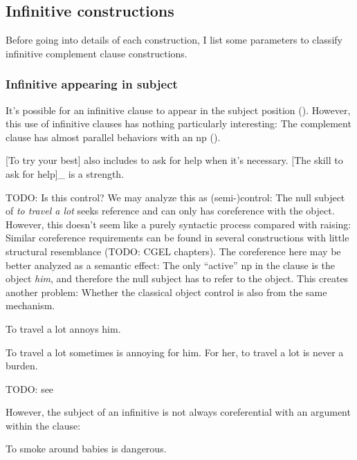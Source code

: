 \documentclass[UTF8, a4paper, oneside, scheme=plain, 12pt]{ctexbook}
\newcommand*{\citepage}[1]{p.~{#1}}
\newcommand{\form}[1]{\emph{#1}}
\begin{document}
\subsection{Infinitive constructions}

Before going into details of each construction,
I list some parameters to classify infinitive complement clause constructions.

\subsubsection{Infinitive appearing in subject}

It's possible for an infinitive clause to appear in the subject position
().
However, this use of infinitive clauses 
has nothing particularly interesting:
The complement clause has almost parallel behaviors with an \acs{np} 
().

\begin{exe}
    \ex\label{ex:complement.infinitive.1} 
    [To try your best] also includes to ask for help when it's necessary.
    \ex\label{ex:complement.infinitive.1p} [The skill to ask for help]_{}
    is a strength.
\end{exe}

TODO: Is this control?
We may analyze this as (semi-)control:
The null subject of \form{to travel a lot} 
seeks reference and can only has coreference with the object.
However, this doesn't seem like a purely syntactic process
compared with raising:
Similar coreference requirements can be found in 
several constructions with little structural resemblance
(TODO: CGEL chapters).
The coreference here may be better analyzed as a semantic effect:
The only ``active'' \acs{np} in the clause is the object \form{him},
and therefore the null subject has to refer to the object.
This creates another problem: 
Whether the classical object control is also from the same mechanism.

\begin{exe}
    \ex To travel a lot annoys him.
\end{exe}
\begin{exe}
    \ex To travel a lot sometimes is annoying for him.
    \ex For her, to travel a lot is never a burden.
\end{exe}

TODO: see \citet[\citepage{1269}]{cgel}

However, the subject of an infinitive is not always coreferential with an argument within the clause:
\begin{exe}
    \ex To smoke around babies is dangerous.
\end{exe} 
\end{document}
